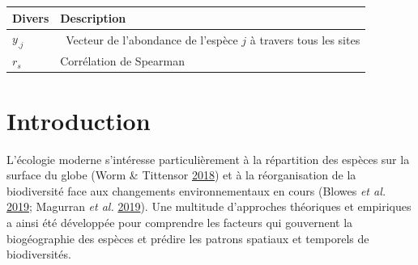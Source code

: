 \documentclass[12pt,]{article}
\begin{document}
{\small
\begin{longtable}[l]{@{}ll@{}}
\toprule
\begin{minipage}[b]{0.19\columnwidth}\raggedright
Divers\strut
\end{minipage} & \begin{minipage}[b]{0.75\columnwidth}\raggedright
Description\strut
\end{minipage}\tabularnewline
\midrule
\endhead
\begin{minipage}[t]{0.19\columnwidth}\raggedright
\(y_{.j}\)\strut
\end{minipage} & \begin{minipage}[t]{0.75\columnwidth}\raggedright
~Vecteur de l'abondance de l'espèce \(j\) à travers tous les sites\strut
\end{minipage}\tabularnewline
\begin{minipage}[t]{0.19\columnwidth}\raggedright
\(r_s\)\strut
\end{minipage} & \begin{minipage}[t]{0.75\columnwidth}\raggedright
Corrélation de Spearman\strut
\end{minipage}\tabularnewline
\bottomrule
\end{longtable}}\FloatBarrier



\setcounter{table}{0}

\tableofcontents

\cleardoublepage 
{}


\hypertarget{introduction}{%
\section{Introduction}\label{introduction}}

L'écologie moderne s'intéresse particulièrement à la répartition des
espèces sur la surface du globe (Worm \& Tittensor
\protect\hyperlink{ref-Worm_2018}{2018}) et à la réorganisation de la
biodiversité face aux changements environnementaux en cours (Blowes
\emph{et al.} \protect\hyperlink{ref-Blowes_2019}{2019}; Magurran
\emph{et al.} \protect\hyperlink{ref-Magurran_2019}{2019}). Une
multitude d'approches théoriques et empiriques a ainsi été développée
pour comprendre les facteurs qui gouvernent la biogéographie des espèces
et prédire les patrons spatiaux et temporels de biodiversités.
\end{document}
